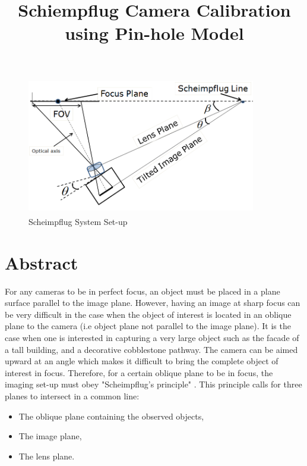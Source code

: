 \documentclass[12pt]{article}
\title{Schiempflug Camera Calibration using Pin-hole Model}
\author
{Peter Fasogbon,$^{1,2\ast}$ others,$^{1}$ others$^{2}$\\
\\
\normalsize{$^{1}$Laboratoire Lagis, University of Lille1,}\\
\normalsize{Villeneuve d'ascq, Cite scientifique, LILLE, FRANCE}\\
\normalsize{$^{2}$SNCF Direction de l'inginerie, ---, Plane Saint Senis, FRANCE}\\
\\
\normalsize{$^\ast$ E-mail:  faspetpeak@yahoo.com}
}
\date{}
\begin{document}
 


\baselineskip24pt


\maketitle 



\begin{figure}[htb]
	\centering
	\includegraphics[height=6cm, width=10cm]{figures/scheimpflug1.png}
	\caption {Scheimpflug System Set-up}

	\label{fig:scheimpflug2}
\end{figure}




\section*{Abstract}

For any cameras to be in perfect focus, an object must be placed in a plane surface parallel to the image plane. However, having an image at sharp focus can be very difficult in the case when the object of interest is located in an oblique plane to the camera (i.e object plane not parallel to the image plane). It is the case when one is interested in capturing a very large object such as the facade of a tall building, and a decorative cobblestone pathway. The camera can be aimed upward at an angle which makes it difficult to bring the complete object of interest in focus.  Therefore, for a certain oblique plane to be in focus, the imaging set-up must obey "Scheimpflug's principle" \cite{Douglas}. This principle calls for three planes to intersect in a common line:



\begin{itemize}
\item  The oblique plane containing the observed objects,
\item  The image plane,
\item  The lens plane.
\end{itemize}
\end{document}
